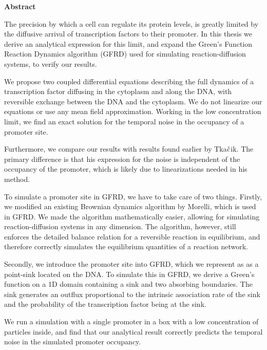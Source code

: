 \begin{center}
{\center \bf Abstract}
\end{center}

The precision by which a cell can regulate its protein levels, is greatly limited by the diffusive arrival of transcription factors to their promoter. In this thesis we derive an analytical expression for this limit, and expand the Green's Function Reaction Dynamics algorithm (GFRD) used for simulating reaction-diffusion systems, to verify our results.

We propose two coupled differential equations describing the full dynamics of a transcription factor diffusing in the cytoplasm and along the DNA, with reversible exchange between the DNA and the cytoplasm. We do not linearize our equations or use any mean field approximation. Working in the low concentration limit, we find an exact solution for the temporal noise in the occupancy of a promoter site. 

Furthermore, we compare our results with results found earlier by Tka$\check{\rm c}$ik. The primary difference is that his expression for the noise is independent of the occupancy of the promoter, which is likely due to linearizations needed in his method.

To simulate a promoter site in GFRD, we have to take care of two things. Firstly, we modified an existing Brownian dynamics algorithm by Morelli, which is used in GFRD. We made the algorithm mathematically easier, allowing for simulating reaction-diffusion systems in any dimension. The algorithm, however, still enforces the detailed balance relation for a reversible reaction in equilibrium, and therefore correctly simulates the equilibrium quantities of a reaction network. 

Secondly, we introduce the promoter site into GFRD, which we represent as as a point-sink located on the DNA. To simulate this in GFRD, we derive a Green's function on a 1D domain containing a sink and two absorbing boundaries. The sink generates an outflux proportional to the intrinsic association rate of the sink and the probability of the transcription factor being at the sink. 

We run a simulation with a single promoter in a box with a low concentration of particles inside, and find that our analytical result correctly predicts the temporal noise in the simulated promoter occupancy.


